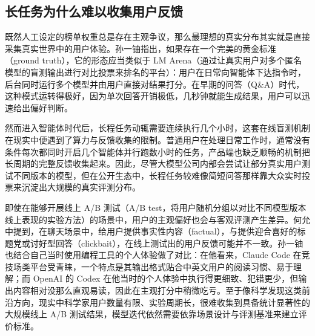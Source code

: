 \documentclass[UTF8,a4paper,11pt,fontset=fandol]{ctexart}
\begin{document}
\subsection{长任务为什么难以收集用户反馈}
既然人工设定的榜单权重总是存在主观争议，那么最理想的真实分布其实就是直接采集真实世界中的用户体验。孙一铀指出，如果存在一个完美的黄金标准（ground truth），它的形态应当类似于 LM Arena（通过让真实用户对多个匿名模型的盲测输出进行对比投票来排名的平台）：用户在日常向智能体下达指令时，后台同时运行多个模型并由用户直接对结果打分。在早期的问答（Q\&A）时代，这种模式运转得极好，因为单次回答开销极低，几秒钟就能生成结果，用户可以迅速给出偏好判断。

然而进入智能体时代后，长程任务动辄需要连续执行几个小时，这套在线盲测机制在现实中便遇到了算力与反馈收集的限制。普通用户在处理日常工作时，通常没有条件每次都同时开启几个智能体并行跑数小时的任务，产品端也缺乏顺畅的机制把长周期的完整反馈收集起来。因此，尽管大模型公司内部会尝试让部分真实用户测试不同版本的模型，但在公开生态中，长程任务较难像简短问答那样靠大众实时投票来沉淀出大规模的真实评测分布。

即使在能够开展线上 A/B 测试（A/B test，将用户随机分组以对比不同模型版本线上表现的实验方法）的场景中，用户的主观偏好也会与客观评测产生差异。何允中提到，在聊天场景中，给用户提供事实性内容（factual），与提供迎合喜好的标题党或讨好型回答（clickbait），在线上测试出的用户反馈可能并不一致。孙一铀也结合自己当时使用编程工具的个人体验做了对比：在他看来，Claude Code 在竞技场类平台受青睐，一个特点是其输出格式贴合中英文用户的阅读习惯、易于理解；而 OpenAI 的 Codex 在他当时的个人体验中执行得更细致、犯错更少，但输出内容相对没那么直观易读，因此在主观打分中稍微吃亏。至于像科学发现这类前沿方向，现实中科学家用户数量有限、实验周期长，很难收集到具备统计显著性的大规模线上 A/B 测试结果，模型迭代依然需要依靠场景设计与评测基准来建立评价标准。
\end{document}
